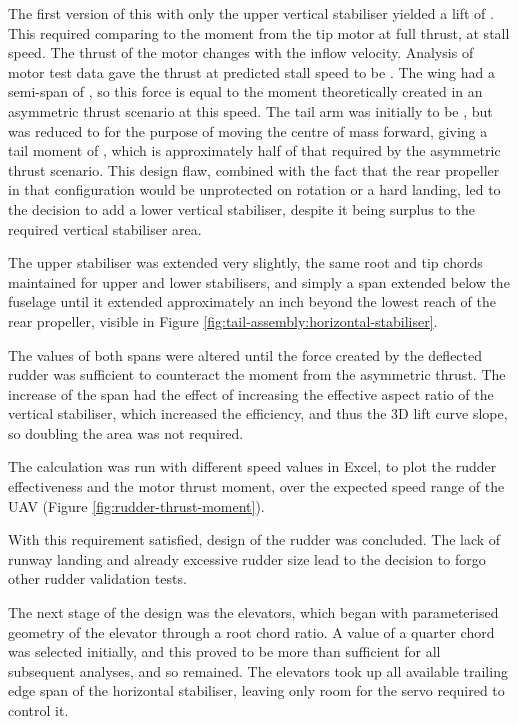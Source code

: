 \documentclass[../../main.tex]{subfiles}
\begin{document}
The first version of this with only the upper vertical stabiliser yielded a lift of .
This required comparing to the moment from the tip motor at full thrust, at stall speed.
The thrust of the motor changes with the inflow velocity.
Analysis of motor test data gave the thrust at predicted stall speed to be .
The wing had a semi-span of , so this force is equal to the moment theoretically created in an asymmetric thrust scenario at this speed.
The tail arm was initially to be , but was reduced to  for the purpose of moving the centre of mass forward, giving a tail moment of , which is approximately half of that required by the asymmetric thrust scenario.
This design flaw, combined with the fact that the rear propeller in that configuration would be unprotected on rotation or a hard landing, led to the decision to add a lower vertical stabiliser, despite it being surplus to the required vertical stabiliser area. 

The upper stabiliser was extended very slightly, the same root and tip chords maintained for upper and lower stabilisers, and simply a span extended below the fuselage until it extended approximately an inch beyond the lowest reach of the rear propeller, visible in Figure \ref{fig:tail-assembly:horizontal-stabiliser}.  %

The values of both spans were altered until the force created by the deflected rudder was sufficient to counteract the moment from the asymmetric thrust.
The increase of the span had the effect of increasing the effective aspect ratio of the vertical stabiliser, which increased the efficiency, and thus the 3D lift curve slope, so doubling the area was not required. 

The calculation was run with different speed values in Excel, to plot the rudder effectiveness and the motor thrust moment, over the expected speed range of the UAV (Figure \ref{fig:rudder-thrust-moment}).


With this requirement satisfied, design of the rudder was concluded.
The lack of runway landing and already excessive rudder size lead to the decision to forgo other rudder validation tests. 

The next stage of the design was the elevators, which began with parameterised geometry of the elevator through a root chord ratio.
A value of a quarter chord was selected initially, and this proved to be more than sufficient for all subsequent analyses, and so remained.
The elevators took up all available trailing edge span of the horizontal stabiliser, leaving only room for the servo required to control it.  
\end{document}
